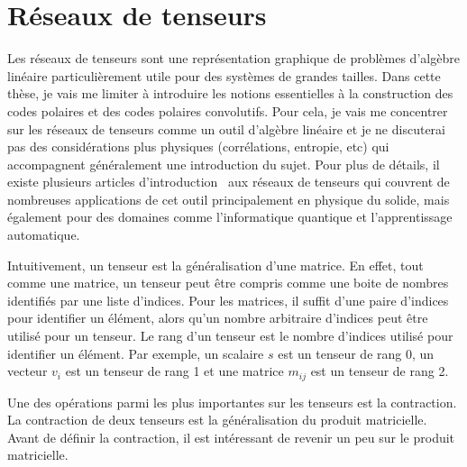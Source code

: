 \section{Réseaux de tenseurs}
\label{sec:reseaux_tenseurs}

Les réseaux de tenseurs sont une représentation graphique de problèmes d'algèbre linéaire
particulièrement utile pour des systèmes de grandes tailles.
Dans cette thèse, 
je vais me limiter à introduire les notions essentielles à la construction des 
codes polaires et des codes polaires convolutifs.
Pour cela, 
je vais me concentrer sur les réseaux de tenseurs comme un outil d'algèbre linéaire 
et je ne discuterai pas des considérations plus physiques (corrélations, entropie, etc) 
qui accompagnent généralement une introduction du sujet.
Pour plus de détails,
il existe plusieurs articles d'introduction~\cite{bridgeman_hand-waving_2017, baker_methodes_2021} aux réseaux de tenseurs qui couvrent de nombreuses applications de cet outil principalement en physique du solide,
mais également pour des domaines comme l'informatique quantique et l'apprentissage automatique. 

Intuitivement, 
un tenseur est la généralisation d'une matrice.
En effet,
tout comme une matrice, 
un tenseur peut être compris comme une boite de nombres identifiés par une liste d'indices. 
Pour les matrices,
il suffit d'une paire d'indices pour identifier un élément,
alors qu'un nombre arbitraire d'indices peut être utilisé pour un tenseur. 
Le rang d'un tenseur est le nombre d'indices utilisé pour identifier un élément.
Par exemple, 
un scalaire $s$ est un tenseur de rang 0, 
un vecteur $v_i$ est un tenseur de rang 1 
et une matrice $m_{ij}$ est un tenseur de rang 2.

Une des opérations parmi les plus importantes sur les tenseurs est la contraction.
La contraction de deux tenseurs est la généralisation du produit matricielle.
Avant de définir la contraction,
il est intéressant de revenir un peu sur le produit matricielle.


